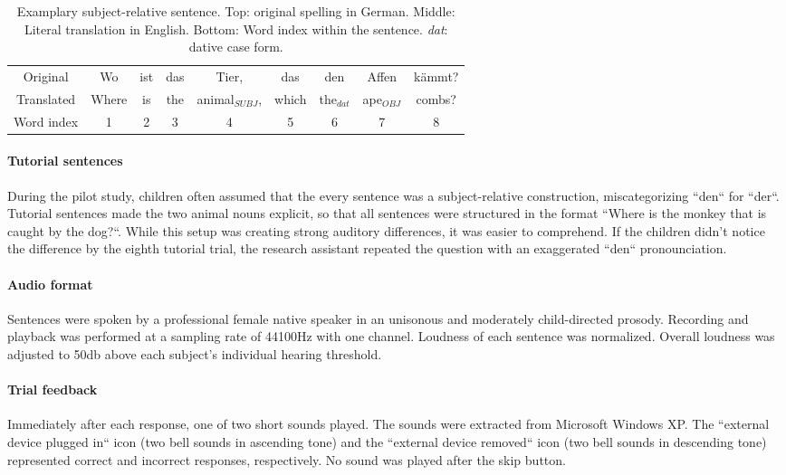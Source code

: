 \begin{table}[htb]
\vspace{5mm}
\begin{center}
\begin{tabular}{c|cccccccc}
Original & Wo & ist & das & Tier, & das & den & Affen & kämmt?\\
Translated & Where & is & the & animal$_{SUBJ}$, & which & the$_{dat}$ & ape$_{OBJ}$ & combs?\\
Word index & 1 & 2 & 3 & 4 & 5 & 6 & 7 & 8
\end{tabular}
\caption{\label{3.1.sentences} Examplary subject-relative sentence. Top: original spelling in German. Middle: Literal translation in English. Bottom: Word index within the sentence. \emph{dat}: dative case form.}
\end{center}
\end{table}

\paragraph{Tutorial sentences}
During the pilot study, children often assumed that the every sentence was a subject-relative construction, miscategorizing ``den`` for ``der``.
Tutorial sentences made the two animal nouns explicit, so that all sentences were structured in the format ``Where is the monkey that is caught by the dog?``.
While this setup was creating strong auditory differences, it was easier to comprehend.
If the children didn't notice the difference by the eighth tutorial trial, the research assistant repeated the question with an exaggerated ``den`` pronounciation.

\paragraph{Audio format}
Sentences were spoken by a professional female native speaker in an uni\-so\-nous and moderately child-directed prosody.
Recording and playback was performed at a sampling rate of 44100Hz with one channel.
Loudness of each sentence was normalized.
Overall loudness was adjusted to 50db above each subject's individual hearing threshold.

\paragraph{Trial feedback}
Immediately after each response, one of two short sounds played.
The sounds were extracted from Microsoft Windows XP.
The ``external device plugged in`` icon (two bell sounds in ascending tone) and the ``external device removed`` icon (two bell sounds in descending tone) represented correct and incorrect responses, respectively.
No sound was played after the skip button.

